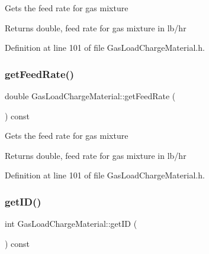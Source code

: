 Gets the feed rate for gas mixture \begin{DoxyReturn}{Returns}
double, feed rate for gas mixture in lb/hr 
\end{DoxyReturn}


Definition at line 101 of file Gas\+Load\+Charge\+Material.\+h.

\mbox{\label{class_gas_load_charge_material_ae14ebe9b7091a491166174968505b6ee}} 
\subsubsection{\texorpdfstring{get\+Feed\+Rate()}{getFeedRate()}\hspace{0.1cm}{\footnotesize\ttfamily [3/3]}}
{\footnotesize\ttfamily double Gas\+Load\+Charge\+Material\+::get\+Feed\+Rate (\begin{DoxyParamCaption}{ }\end{DoxyParamCaption}) const\hspace{0.3cm}{\ttfamily [inline]}}

Gets the feed rate for gas mixture \begin{DoxyReturn}{Returns}
double, feed rate for gas mixture in lb/hr 
\end{DoxyReturn}


Definition at line 101 of file Gas\+Load\+Charge\+Material.\+h.

\mbox{\label{class_gas_load_charge_material_ab3e425ad095a593b7e9e365606759d9d}} 
\subsubsection{\texorpdfstring{get\+I\+D()}{getID()}\hspace{0.1cm}{\footnotesize\ttfamily [1/3]}}
{\footnotesize\ttfamily int Gas\+Load\+Charge\+Material\+::get\+ID (\begin{DoxyParamCaption}{ }\end{DoxyParamCaption}) const\hspace{0.3cm}{\ttfamily [inline]}}

